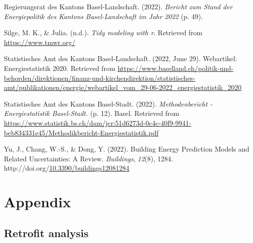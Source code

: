 \documentclass[
  letterpaper,
  DIV=11,
  numbers=noendperiod]{scrreprt}
\newlength{\cslhangindent}
\newlength{\cslentryspacingunit} %
\newenvironment{CSLReferences}[2] %
 {%
  \setlength{\parindent}{0pt}
  \ifodd #1
  \let\oldpar\par
  \def\par{\hangindent=\cslhangindent\oldpar}
  \fi
  \setlength{\parskip}{#2\cslentryspacingunit}
 }%
 {}
\begin{document}
\begin{CSLReferences}{1}{0}
\leavevmode{}%
Regierungsrat des Kantons Basel-Landschaft. (2022). \emph{Bericht zum
Stand der Energiepolitik des Kantons Basel-Landschaft im Jahr 2022} (p.
49).

\leavevmode{}%
Silge, M. K., \& Julia. (n.d.). \emph{Tidy modeling with r}. Retrieved
from \url{https://www.tmwr.org/}

\leavevmode{}%
Statistisches Amt des Kantons Basel-Landschaft. (2022, June 29).
Webartikel: Energiestatistik 2020. Retrieved from
\url{https://www.baselland.ch/politik-und-behorden/direktionen/finanz-und-kirchendirektion/statistisches-amt/publikationen/energie/webartikel_vom_29-06-2022_energiestatistik_2020}

\leavevmode{}%
Statistisches Amt des Kantons Basel-Stadt. (2022). \emph{Methodenbericht
- Energiestatistik Basel-Stadt.} (p. 12). Basel. Retrieved from
\url{https://www.statistik.bs.ch/dam/jcr:51d6273d-0c4c-40f9-9941-beb834331e45/Methodikbericht-Energiestatistik.pdf}

\leavevmode{}%
Yu, J., Chang, W.-S., \& Dong, Y. (2022). Building Energy Prediction
Models and Related Uncertainties: A Review. \emph{Buildings},
\emph{12}(8), 1284.
http://doi.org/\href{https://doi.org/10.3390/buildings12081284}{10.3390/buildings12081284}

\end{CSLReferences}

\appendix
{}

\hypertarget{appendix}{%
\chapter{Appendix}\label{appendix}}

\hypertarget{retrofit-analysis}{%
\section{Retrofit analysis}\label{retrofit-analysis}}
\end{document}
